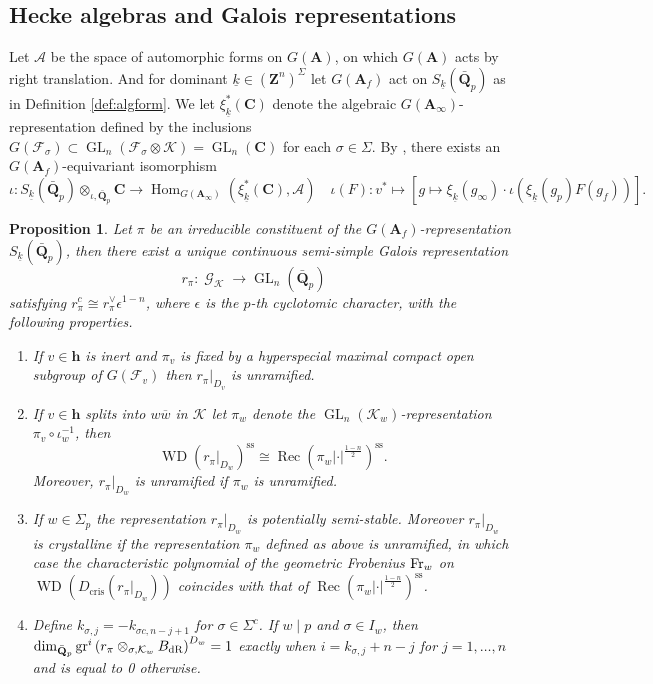 \documentclass[leqno]{amsart}
\newtheorem{prop}[thm]{Proposition}
\theoremstyle{definition}
\theoremstyle{remark}
\newcommand{\Q}{{\mathbf{Q}}}
\newcommand{\Z}{{\mathbf{Z}}}
\newcommand{\C}{\mathbf C}
\newcommand{\A}{\mathbf A}
\newcommand{\finite}{\mathbf{h}}
\DeclareMathOperator{\Hom}{Hom}
\DeclareMathOperator{\GL}{GL}
\DeclareMathOperator{\Gal}{\mathcal{G}}
\DeclareMathOperator{\WD}{WD}
\DeclareMathOperator{\Rec}{Rec}
\newcommand{\Fr}{\textnormal{Fr}} %
\newcommand{\dR}{\textnormal{dR}}
\newcommand{\F}{{\mathcal{F}}} %
\newcommand{\K}{{\mathcal{K}}} %
\newcommand{\bw}{{\overline{w}}}
\newcommand{\wt}[1]{\underline{ #1 }}
\begin{document}
\subsection{Hecke algebras and Galois representations}

Let $\mathcal{A}$ be
the space of automorphic forms on $G(\A)$,
on which $G(\A)$ acts by right translation.
And for dominant $\wt{k}\in (\Z^n)^{\Sigma}$
let $G(\A_f)$ act on $S_{\wt{k}}(\bar{\Q}_p)$
as in Definition \ref{def:algform}.
We let $\xi_{\wt{k}}^*(\C)$
denote the algebraic
$G(\A_\infty)$-representation
defined by the inclusions
$G(\F_\sigma)\subset \GL_n(\F_\sigma\otimes \K)=\GL_n(\C)$
for each $\sigma\in\Sigma$.
By \cite[Prop 3.3.2]{CHT},
there exists an $G(\A_f)$-equivariant isomorphism
\begin{equation}\label{eq:p_to_infty}
	\iota\colon S_{\wt{k}}(\bar{\Q}_p)\otimes_{\iota,\bar{\Q}_p}\C
	\rightarrow \Hom_{G(\A_\infty)} (\xi_{\wt{k}}^*(\C), \mathcal{A})\quad
	\iota(F)\colon v^*\mapsto 
	[g\mapsto \xi_{\wt{k}}(g_\infty)\cdot 
    \iota\left(\xi_{\wt{k}}(g_p)F(g_f)\right)].
\end{equation}


\begin{prop}\cite[Prop.2.27]{ger}\label{prop:gal_ger}
	Let $\pi$ be an irreducible constituent of the
	$G(\A_f)$-representation $S_{\wt{k}}(\bar{\Q}_p)$,
	then there exist a unique 
	continuous semi-simple Galois representation
	\[
	r_\pi: \Gal_\K \rightarrow \GL_n(\bar{\Q}_p)\quad
	\]
    satisfying $r_\pi^c \cong r_\pi^{\vee} \epsilon^{1-n}$,
	where $\epsilon$ is the $p$-th cyclotomic character,
	with the following properties.
\begin{enumerate}[label=(\alph*)]
\item If $v\in \finite$ is inert and $\pi_v$
is fixed by a hyperspecial maximal compact open subgroup 
of $G(\F_v)$ then $r_\pi\vert_{D_v}$ is unramified.
\item If $v\in \finite$ splits into $w\bw$ in $\K$
let $\pi_w$ denote the $\GL_n(\K_w)$-representation
$\pi_v\circ \iota_w^{-1}$, then
\[
\WD\left(\left.r_\pi\right|_{D_w}\right)^{\mathrm{ss}} \cong
\Rec(\pi_w|\cdot|^{\frac{1-n}{2}})^{\mathrm{ss}}.
\]
Moreover, $r_\pi\vert_{D_w}$ is unramified if $\pi_w$ is unramified.
\item 
If $w\in\Sigma_p$ the representation
$r_\pi\vert_{D_w}$ is potentially semi-stable.
Moreover $r_\pi\vert_{D_w}$ is crystalline
if the representation $\pi_w$ defined as above is unramified,
in which case the characteristic polynomial of 
the geometric Frobenius $\Fr_w$ on 
$\WD\left(D_{\mathrm{cris }}\left(\left.r_\pi\right|_{D_w}\right)\right)$
coincides with that of 
$\Rec(\pi_w|\cdot|^{\frac{1-n}{2}})^{\mathrm{ss}}$.
\item 
Define $k_{\sigma,j}=-k_{\sigma c, n-j+1}$ for $\sigma\in \Sigma^c$.
If $w\mid p$ and  $\sigma\in I_w$, then 
$\dim_{\bar{\Q}_p}\operatorname{gr}^i
\left(r_\pi \otimes_{\sigma, \K_w} B_{\dR}\right)^{D_w}=1$
exactly when $i=k_{\sigma, j}+n-j$ 
for $j=1, \ldots, n$ and is equal to 0 otherwise.
\end{enumerate}
\end{prop}
\end{document}
